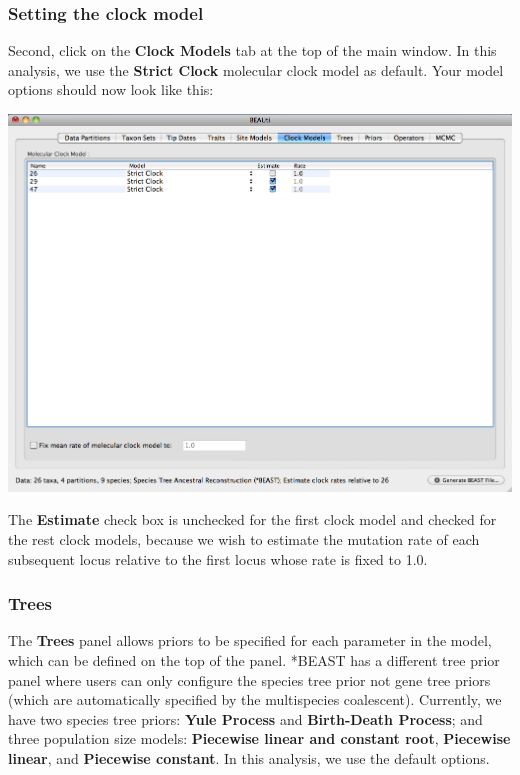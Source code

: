 \documentclass[12pt]{article}
\begin{document}
\medskip{}

\subsubsection*{Setting the clock model}

Second, click on the {\bf Clock Models} tab at the top of the
main window. In this analysis, we use the \textbf{Strict Clock} molecular clock model as default.
Your model options should now look like this: 

\medskip{}

\includegraphics[scale=0.4]{figures/BEAUti_Clock}

\medskip{}

The \textbf{Estimate} check box is unchecked for the first clock model and checked for the rest clock models, because we wish to estimate the mutation rate of each subsequent locus relative to the first locus whose rate is fixed to 1.0. 

\subsubsection*{Trees}

The {\bf Trees} panel allows priors to be specified for each parameter in the model, which can be defined on the top of the panel. *BEAST has a different tree prior panel where users can only configure the species tree prior not gene tree priors (which are automatically specified by the multispecies coalescent). Currently, we have two species tree priors: \textbf{Yule Process} and \textbf{Birth-Death Process}; and three population size models: \textbf{Piecewise linear and constant root}, \textbf{Piecewise linear}, and \textbf{Piecewise constant}. In this analysis, we use the default options.
\end{document}
